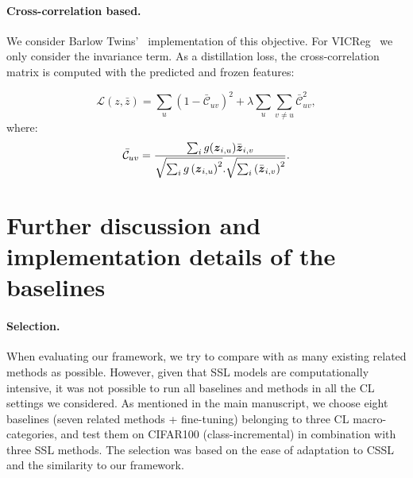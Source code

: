 \paragraph{Cross-correlation based.} We consider Barlow Twins'~ \cite{zbontar2021barlow} implementation of this objective. For VICReg~\cite{bardes2021vicreg} we only consider the invariance term. As a distillation loss, the cross-correlation matrix is computed with the predicted and frozen features:

\begin{equation}
    \mathcal{L}(z, \bar{z}) = \sum_{u}\left(1-\bar{\mathcal{C}}_{u v}\right)^{2}+\lambda \sum_{u} \sum_{v \neq u} \bar{\mathcal{C}}_{u v}^{2} ,
\end{equation}
where:
\begin{equation}
    \bar{\mathcal{C}}_{u v} = \frac{\sum_{i} g(\boldsymbol{z}_{i, u}) \bar{\boldsymbol{z}}_{i, v}}{\sqrt{\sum_{i}g\left(\boldsymbol{z}_{i, u}\right)^{2}}. \sqrt{\sum_{i}\left(\bar{\boldsymbol{z}}_{i, v}\right)^{2}}}.
\end{equation} 

\section{Further discussion and implementation details of the baselines}
\paragraph{Selection.} When evaluating our framework, we try to compare with as many existing related methods as possible. However, given that SSL models are computationally intensive, it was not possible to run all baselines and methods in all the CL settings we considered. As mentioned in the main manuscript, we choose eight baselines (seven related methods + fine-tuning) belonging to three CL macro-categories, and test them on CIFAR100 (class-incremental) in combination with three SSL methods. The selection was based on the ease of adaptation to CSSL and the similarity to our framework.

